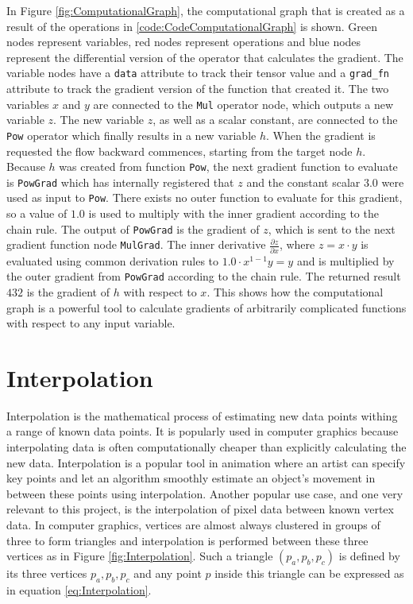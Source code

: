 In Figure \ref{fig:ComputationalGraph}, the computational graph that is created as a result of the operations in \ref{code:CodeComputationalGraph} is shown. Green nodes represent variables, red nodes represent operations and blue nodes represent the differential version of the operator that calculates the gradient. The variable nodes have a \texttt{data} attribute to track their tensor value and a \texttt{grad\_fn} attribute to track the gradient version of the function that created it. The two variables $x$ and $y$ are connected to the \texttt{Mul} operator node, which outputs a new variable $z$. The new variable $z$, as well as a scalar constant, are connected to the \texttt{Pow} operator which finally results in a new variable $h$. When the gradient is requested the flow backward commences, starting from the target node $h$. Because $h$ was created from function \texttt{Pow}, the next gradient function to evaluate is \texttt{PowGrad} which has internally registered that $z$ and the constant scalar $3.0$ were used as input to \texttt{Pow}. There exists no outer function to evaluate for this gradient, so a value of $1.0$ is used to multiply with the inner gradient according to the chain rule. The output of \texttt{PowGrad} is the gradient of $z$, which is sent to the next gradient function node \texttt{MulGrad}. The inner derivative $\frac{\partial z}{\partial x}$, where $z=x\cdot y$ is evaluated using common derivation rules to $1.0\cdot x^{1-1}y = y$ and is multiplied by the outer gradient from \texttt{PowGrad} according to the chain rule. The returned result $432$ is the gradient of $h$ with respect to $x$. This shows how the computational graph is a powerful tool to calculate gradients of arbitrarily complicated functions with respect to any input variable.

\section{Interpolation}\label{sec:Interpolation}

Interpolation is the mathematical process of estimating new data points withing a range of known data points. It is popularly used in computer graphics because interpolating data is often computationally cheaper than explicitly calculating the new data. Interpolation is a popular tool in animation where an artist can specify key points and let an algorithm smoothly estimate an object's movement in between these points using interpolation. Another popular use case, and one very relevant to this project, is the interpolation of pixel data between known vertex data. In computer graphics, vertices are almost always clustered in groups of three to form triangles and interpolation is performed between these three vertices as in Figure \ref{fig:Interpolation}. Such a triangle $(p_a,p_b,p_c)$ is defined by its three vertices $p_a,p_b,p_c$ and any point $p$ inside this triangle can be expressed as in equation \ref{eq:Interpolation}.

